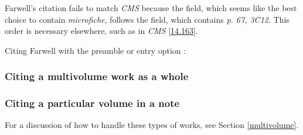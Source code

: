 \documentclass[11pt,letterpaper,oneside]{article}
\begin{document}
Farwell's citation fails to match \textit{CMS} because the
 field, which seems like the best choice to
contain \textit{microfiche}, follows the  field,
which contains \textit{p. 67, 3C12}. This order is necessary
elsewhere, such as in \textit{CMS} \ref{14.163}.

\begin{citebib}
\item \cite[p. 67, 3C12]{farwell1997}
\item \cite{tauber1958}
\end{citebib}

\noindent Citing Farwell with the preamble or entry option
:

\begin{citebib}
\item \cite[p. 67, 3C12]{farwell1997}
\end{citebib}

\setcounter{subsubsection}{116}
\subsubsection{Citing a multivolume work as a whole}
\label{14.117}

\begin{citebib}
\item \cite{aristotle1983}
\item \cite{byrne1981}
\item \cite{james1962}
\end{citebib}

\subsubsection{Citing a particular volume in a note}
\label{14.118}

For a discussion of how to handle these types of works, see Section
\ref{multivolume}.

\begin{citebib}
\item \cite[4:243]{byrne1981}
\item \cite*[32--33]{james1963.5}
\item \cite[4:245]{byrne1981}
\item \cite*[34]{james1963.5}
\end{citebib}
\end{document}
